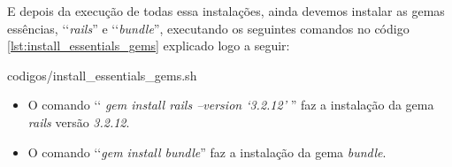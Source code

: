 E depois da execução de todas essa instalações, ainda devemos instalar as gemas essências, ‘‘\emph{rails}'' 
e ‘‘\emph{bundle}'', executando os seguintes comandos no código 
\ref{lst:install_essentials_gems} explicado logo a seguir:
 

{codigos/install_essentials_gems.sh}

\begin{itemize}

 \item O comando ‘‘ \emph{gem install rails --version ‘3.2.12'} '' faz a instalação da gema \emph{rails}
 versão \emph{3.2.12}.
 
 \item O comando ‘‘\emph{gem install bundle}'' faz a instalação da gema \emph{bundle}.
 
\end{itemize}